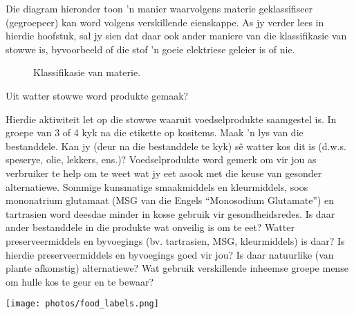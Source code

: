       \label{m38708*id62556}Die diagram hieronder toon 'n manier waarvolgens materie geklassifiseer (gegroepeer) kan word volgens verskillende eienskappe. As jy verder lees in hierdie hoofstuk, sal jy sien dat daar ook ander maniere van die klassifikasie van stowwe is, byvoorbeeld of die stof 'n goeie elektriese geleier is of nie.\par 
    \setcounter{subfigure}{0}
	\begin{figure}[H] %
    \begin{center}
    \end{center}
\caption{Klassifikasie van materie.}
\label{fig:c:ClassificationOfMatter}
 \end{figure}      
    \label{m38708*eip-344}\begin{activity}{Uit watter stowwe word produkte gemaak?}
{
\begin{minipage}{.5\textwidth}
Hierdie aktiwiteit let op die stowwe waaruit voedselprodukte saamgestel is. In groepe van 3 of 4 kyk na die etikette op kositems. Maak 'n lys van die bestanddele. Kan jy (deur na die bestanddele te kyk) s\^e watter kos dit is (d.w.s. speserye, olie, lekkers, ens.)? Voedselprodukte word gemerk om vir jou as verbruiker te help om te weet wat jy eet asook met die keuse van gesonder alternatiewe. Sommige kunsmatige smaakmiddels en kleurmiddels, soos mononatrium glutamaat (MSG van die Engels ``Monosodium Glutamate'') en tartrasien word deesdae minder in kosse gebruik vir gesondheidsredes. Is daar ander bestanddele in die produkte wat onveilig is om te eet? Watter preserveermiddels en byvoegings (bv. tartrasien, MSG, kleurmiddels) is daar? Is hierdie preserveermiddels en byvoegings goed vir jou? Is daar natuurlike (van plante afkomstig) alternatiewe? Wat gebruik verskillende inheemse groepe mense om hulle kos te geur en te bewaar?
\end{minipage}
\begin{minipage}{.5\textwidth}
 \begin{center}
 \texttt{[image: photos/food\_labels.png]}\par
\end{center}
\end{minipage}

 }  \end{activity}
